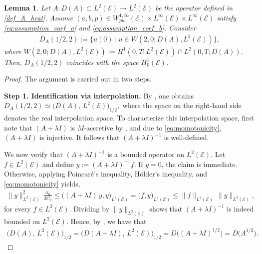 \documentclass[10pt,a4paper]{amsart}
\def\to{\rightarrow}
\newtheorem{lemma}{Lemma}[section]
\begin{document}
\begin{lemma}\label{lemma:fractional_power}
Let $A:D(A)\subset L^2(\mathcal{E})\to L^2(\mathcal E)$ be the operator defined in \eqref{def_A_heat}. Assume $(a,b,p)\in W^{1,\infty}_{pw}(\mathcal{E})\times L^{\infty}(\mathcal{E})\times L^{\infty}(\mathcal{E})$ satisfy \eqref{eq:assumption_coef_a} and \eqref{eq:assumption_coef_b}. Consider 
\begin{align*}
    D_{A}(1/2,2):=\{u(0)\,:\, u\in W(2,0; D(A),L^2(\mathcal{E}))\},
\end{align*}
where $ W(2,0;D(A),L^2(\mathcal{E})):= H^1(0,T;L^2(\mathcal{E}))\cap L^2(0,T; D(A))$. Then, $D_{A}(1/2,2)$ coincides with the space $H^1_{0}(\mathcal{E})$. 
\end{lemma}
\begin{proof}
The argument is carried out in two steps.

\smallbreak
\noindent
\textbf{Step 1. Identification via interpolation.}
By \cite[Proposition~4.3]{Bensoussan}, one obtains $D_{A}(1/2,2) \simeq \bigl(D(A),\,L^2(\mathcal{E})\bigr)_{1/2},$ where the space on the right-hand side denotes the real interpolation space. To characterize this interpolation space, first note that $(A + \lambda I)$ is $M$-accretive by , and due to \eqref{eq:momotonicity}, $(A + \lambda I)$ is injective. It follows that $(A + \lambda I)^{-1}$ is well-defined.

We now verify that $(A + \lambda I)^{-1}$ is a bounded operator on $L^2(\mathcal{E})$. Let $f \in L^2(\mathcal{E})$ and define $y := (A+\lambda I)^{-1} f$. If $y=0$, the claim is immediate. Otherwise, applying Poincaré's inequality, Hölder's inequality, and \eqref{eq:momotonicity} yields,
\begin{align*}
\|y\|_{L^2(\mathcal{E})}^2 \,\frac{a_0}{2C_p}
\le
\bigl((A+\lambda I)\,y,y\bigr)_{L^2(\mathcal{E})}
=
\bigl(f,y\bigr)_{L^2(\mathcal{E})}
\le
\|f\|_{L^2(\mathcal{E})}\,\|y\|_{L^2(\mathcal{E})}, 
\end{align*}
for every $f\in L^2(\mathcal{E})$. Dividing by $\|y\|_{L^2(\mathcal{E})}$ shows that $(A + \lambda I)^{-1}$ is indeed bounded on $L^2(\mathcal{E})$. Hence, by \cite[Proposition~6.1]{Bensoussan}, we have that
\begin{align}\label{eq:interpolations_frac}
\bigl(D(A),\,L^2(\mathcal{E})\bigr)_{1/2}
=
\bigl(D(A+\lambda I),\,L^2(\mathcal{E})\bigr)_{1/2}
=
D\bigl((A+\lambda I)^{1/2}\bigr)
=
D\bigl(A^{1/2}\bigr).
\end{align}


\end{proof}
\end{document}
